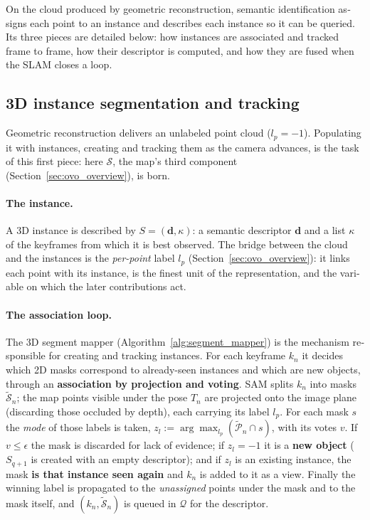 \begin{otherlanguage}{english}
On the cloud produced by geometric reconstruction, semantic identification assigns each point to an
instance and describes each instance so it can be queried. Its three pieces are detailed below: how
instances are associated and tracked frame to frame, how their descriptor is computed, and how they
are fused when the SLAM closes a loop.

\subsection{3D instance segmentation and tracking}
\label{sec:ovo_segment_mapper}

Geometric reconstruction delivers an unlabeled point cloud ($l_p = -1$). Populating it with
instances, creating and tracking them as the camera advances, is the task of this first piece: here
$\mathcal{S}$, the map's third component (Section~\ref{sec:ovo_overview}), is born.

\paragraph{The instance.} A 3D instance is described by $S = (\mathbf{d}, \kappa)$: a semantic
descriptor $\mathbf{d}$ and a list $\kappa$ of the keyframes from which it is best observed. The
bridge between the cloud and the instances is the \emph{per-point} label $l_p$
(Section~\ref{sec:ovo_overview}): it links each point with its instance, is the finest unit of the
representation, and the variable on which the later contributions act.

\paragraph{The association loop.} The 3D segment mapper (Algorithm~\ref{alg:segment_mapper}) is the
mechanism responsible for creating and tracking instances. For each keyframe $k_n$ it decides which
2D masks correspond to already-seen instances and which are new objects, through an
\textbf{association by projection and voting}. SAM splits $k_n$ into masks $\tilde{\mathcal{S}}_n$;
the map points visible under the pose $T_n$ are projected onto the image plane (discarding those
occluded by depth), each carrying its label $l_p$. For each mask $s$ the \emph{mode} of those labels
is taken, $z_l := \arg\max_{l_p} (\tilde{\mathcal{P}}_n \cap s)$, with its votes $v$. If
$v \le \epsilon$ the mask is discarded for lack of evidence; if $z_l = -1$ it is a \textbf{new object}
($S_{q+1}$ is created with an empty descriptor); and if $z_l$ is an existing instance, the mask
\textbf{is that instance seen again} and $k_n$ is added to it as a view. Finally the winning label is
propagated to the \emph{unassigned} points under the mask and to the mask itself, and
$(k_n, \tilde{\mathcal{S}}_n)$ is queued in $\mathcal{Q}$ for the descriptor.


\end{otherlanguage}
